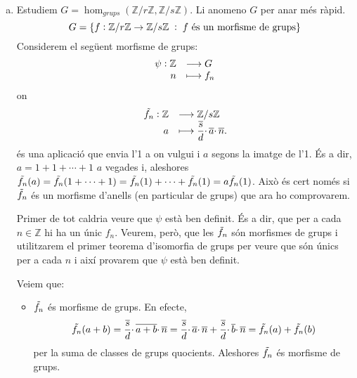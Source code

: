 \documentclass[../main.tex]{subfiles}
\begin{document}
\begin{sol}
\begin{enumerate}[(a)]
    \item Estudiem $G = \hom_{grups}(\mathbb{Z}/r\mathbb{Z},\mathbb{Z}/s\mathbb{Z})$. Li anomeno $G$ per anar més ràpid.
    \begin{equation}
        \notag
        G = \{f:\mathbb{Z}/r\mathbb{Z}\rightarrow \mathbb{Z}/s\mathbb{Z}\;:\;\text{$f$ és un morfisme de grups}\}
    \end{equation}
    Considerem el següent morfisme de grups:
    \begin{equation}
        \notag
        \begin{array}{rl}
            \psi:\mathbb{Z} & \longrightarrow G \\
            n & \longmapsto f_n
        \end{array}
    \end{equation}
    on
    \begin{equation}
        \notag
        \begin{array}{rl}
            \Tilde{f_n}:\mathbb{Z} & \longrightarrow \mathbb{Z}/s\mathbb{Z} \\
            a & \longmapsto \dfrac{\overline{s}}{d}\cdotp\overline{a}\cdotp\overline{n}.
        \end{array}
    \end{equation}
    és una aplicació que envia l'1 a on vulgui i $a$ segons la imatge de l'1. És a dir, $a = 1+1+\cdots+1$ $a$ vegades i, aleshores $\Tilde{f_n}(a) = \Tilde{f_n}(1+\cdots+1) = \Tilde{f_n}(1) + \cdots + \Tilde{f_n}(1) = a\Tilde{f_n}(1)$. Això és cert només si $\Tilde{f}_n$ és un morfisme d'anells (en particular de grups) que ara ho comprovarem.
    
    Primer de tot caldria veure que $\psi$ està ben definit. És a dir, que per a cada $n\in\mathbb{Z}$ hi ha un únic $f_n$. Veurem, però, que les $\Tilde{f}_n$ són morfismes de grups i utilitzarem el primer teorema d'isomorfia de grups per veure que són únics per a cada $n$ i així provarem que $\psi$ està ben definit.
    
    Veiem que:
    \begin{itemize}
        \item $\Tilde{f_n}$ és morfisme de grups. En efecte, 
        \begin{equation}
            \notag
            \Tilde{f_n}(a+b) = \frac{\overline{s}}{d}\cdotp\overline{a+b}\cdotp\overline{n} = \frac{\overline{s}}{d}\cdotp\overline{a}\cdotp\overline{n}+\frac{\overline{s}}{d}\cdotp\overline{b}\cdotp\overline{n} = \Tilde{f_n}(a)+\Tilde{f_n}(b)
        \end{equation}
        per la suma de classes de grups quocients. Aleshores $\Tilde{f_n}$ és morfisme de grups.
        

\end{itemize}
\end{enumerate}
\end{sol}
\end{document}

